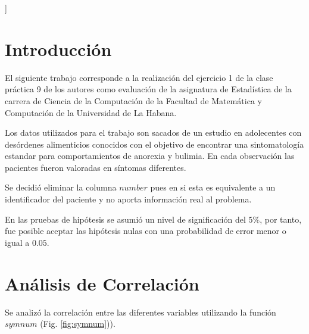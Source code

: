 \documentclass[a4paper,10pt,twocolumn]{article}
\begin{document}
	
	\vspace{0.8cm}
	]
	
	
	
	\section{Introducción}\label{sec:intro}
	
	El siguiente trabajo corresponde a la realización del ejercicio 1 de la clase práctica 9 de los autores como evaluación de la asignatura de Estadística de la carrera de Ciencia de la Computación de la Facultad de Matemática y Computación de la Universidad de La Habana.
	
	Los datos utilizados para el trabajo son sacados de un estudio en adolecentes con desórdenes alimenticios conocidos con el objetivo de encontrar una sintomatología estandar para comportamientos de anorexia y bulimia. En cada observación las pacientes fueron valoradas en síntomas diferentes.
	
	Se decidió eliminar la columna $number$ pues en si esta es equivalente a un identificador del paciente y no aporta información real al problema.
	
	En las pruebas de hipótesis se asumió un nivel de significación del $5\%$, por tanto, fue posible aceptar las hipótesis nulas con una probabilidad de error menor o igual a $0.05$.
	
	\section{Análisis de Correlación}\label{sec:ana_cor}
	
	
	Se analizó la correlación entre las diferentes variables utilizando la función $symnum$ (Fig. \ref{fig:symnum})).
	
\end{document}
